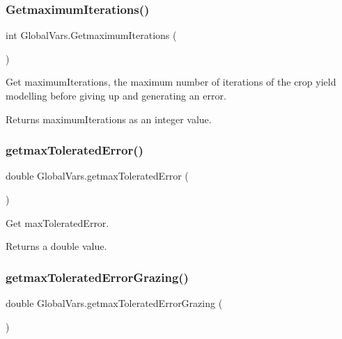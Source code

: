 \subsubsection{\texorpdfstring{GetmaximumIterations()}{GetmaximumIterations()}}
{\footnotesize\ttfamily int Global\+Vars.\+Getmaximum\+Iterations (\begin{DoxyParamCaption}{ }\end{DoxyParamCaption})\hspace{0.3cm}{\ttfamily [inline]}}



Get maximum\+Iterations, the maximum number of iterations of the crop yield modelling before giving up and generating an error. 

\begin{DoxyReturn}{Returns}
maximum\+Iterations as an integer value. 
\end{DoxyReturn}
\mbox{\label{class_global_vars_ac5ca0cf675cbc4a5fc18f93f714b03bc}} 
\subsubsection{\texorpdfstring{getmaxToleratedError()}{getmaxToleratedError()}}
{\footnotesize\ttfamily double Global\+Vars.\+getmax\+Tolerated\+Error (\begin{DoxyParamCaption}{ }\end{DoxyParamCaption})\hspace{0.3cm}{\ttfamily [inline]}}



Get max\+Tolerated\+Error. 

\begin{DoxyReturn}{Returns}
a double value. 
\end{DoxyReturn}
\mbox{\label{class_global_vars_a6cf904264e03e8361a2e4c45b88fdfcd}} 
\subsubsection{\texorpdfstring{getmaxToleratedErrorGrazing()}{getmaxToleratedErrorGrazing()}}
{\footnotesize\ttfamily double Global\+Vars.\+getmax\+Tolerated\+Error\+Grazing (\begin{DoxyParamCaption}{ }\end{DoxyParamCaption})\hspace{0.3cm}{\ttfamily [inline]}}



